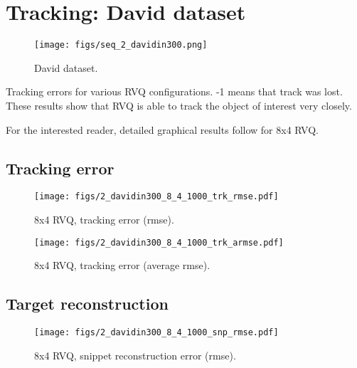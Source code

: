 \clearpage
\newpage
\section{Tracking: David dataset} 
								\begin{figure}[h!]
								\centering
								\texttt{[image: figs/seq\_2\_davidin300.png]}
								\caption{David dataset.}
								\label{fig:seq_1_David}
								\end{figure}



\begin{table}[h]
\centering

\caption{Tracking errors for various RVQ configurations.  -1 means that track was lost.  These results show that RVQ is able to track the object of interest very closely.}
\end{table}

For the interested reader, detailed graphical results follow for 8x4 RVQ.

\clearpage
\newpage
\subsection{Tracking error}

								\begin{figure}[h!]
								\centering
								\texttt{[image: figs/2\_davidin300\_8\_4\_1000\_trk\_rmse.pdf]}
								\caption{8x4 RVQ, tracking error (rmse).}
								\label{fig:2_davidin300_8_4_1000_trk_rmse}
								\end{figure}


								\begin{figure}[h!]
								\centering
								\texttt{[image: figs/2\_davidin300\_8\_4\_1000\_trk\_armse.pdf]}
								\caption{8x4 RVQ, tracking error (average rmse).}
								\label{fig:2_davidin300_8_4_1000_trk_avg_rmse}
								\end{figure}

\clearpage
\newpage
\subsection{Target reconstruction}

								\begin{figure}[h!]
								\centering
								\texttt{[image: figs/2\_davidin300\_8\_4\_1000\_snp\_rmse.pdf]}
								\caption{8x4 RVQ, snippet reconstruction error (rmse).}
								\label{fig:2_davidin300_8_4_1000_snp_rmse}
								\end{figure}


